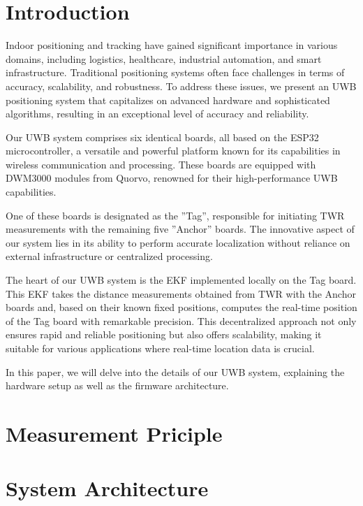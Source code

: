 \documentclass[10pt,a4paper,twocolumn]{article}
\begin{document}

\section{Introduction}\label{section:intro}
Indoor positioning and tracking have gained significant importance in various domains,
including logistics, healthcare, industrial automation, and smart infrastructure.
Traditional positioning systems often face challenges in terms of accuracy, scalability,
and robustness.
To address these issues, we present an \ac{UWB} positioning system that capitalizes
on advanced hardware and sophisticated algorithms,
resulting in an exceptional level of accuracy and reliability.

Our \ac{UWB} system comprises six identical boards,
all based on the ESP32 microcontroller, a versatile and powerful platform known
for its capabilities in wireless communication and processing.
These boards are equipped with \ac{DWM3000} modules from Quorvo,
renowned for their high-performance UWB capabilities.

One of these boards is designated as the ''Tag'',
responsible for initiating \ac{TWR} measurements with the remaining five ''Anchor'' boards.
The innovative aspect of our system lies in its ability to perform accurate localization
without reliance on external infrastructure or centralized processing.

The heart of our UWB system is the \ac{EKF} implemented locally on the Tag board.
This EKF takes the distance measurements obtained from TWR with the Anchor boards and,
based on their known fixed positions, computes the real-time position of the Tag board
with remarkable precision.
This decentralized approach not only ensures rapid and reliable positioning but also
offers scalability, making it suitable for various applications where real-time location
data is crucial.

In this paper, we will delve into the details of our \ac{UWB} system,
explaining the hardware setup as well as the firmware architecture.

\section{Measurement Priciple}\label{Section:principle}
\lipsum[2-4]
\section{System Architecture}\label{section:system_arch}
\end{document}
